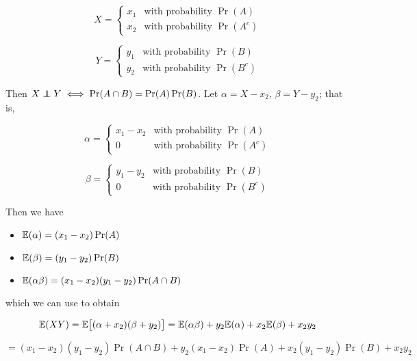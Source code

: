 \begin{enumerate}[(1)]
\begin{enumerate}[(a)]
\[
X = \begin{cases}
x_1 & \text{with probability } \Pr(A) \\
x_2 & \text{with probability } \Pr(A^c)
\end{cases} 
\]

\[
Y = \begin{cases}
y_1 & \text{with probability } \Pr(B) \\
y_2 & \text{with probability } \Pr(B^c)
\end{cases} 
\]

Then \(X \indep Y \iff \Pr(A \cap B) = \Pr(A) \Pr(B)\). Let \(\alpha = X - x_2\), \(\beta = Y - y_2\); that is,

\[
\alpha = \begin{cases}
x_1 - x_2 & \text{with probability } \Pr(A) \\
0 & \text{with probability } \Pr(A^c)
\end{cases} 
\]

\[
\beta = \begin{cases}
y_1 - y_2 & \text{with probability } \Pr(B) \\
0 & \text{with probability } \Pr(B^c)
\end{cases} 
\]

Then we have

\begin{itemize}

\item \(\mathbb{E}(\alpha) = (x_1 - x_2) \Pr(A)\)

\item \(\mathbb{E}(\beta) = (y_1 - y_2) \Pr(B)\)

\item \(\mathbb{E}(\alpha \beta) = (x_1 - x_2)(y_1 - y_2) \Pr(A \cap B)\)

\end{itemize}

which we can use to obtain

%

\[
\mathbb{E}(XY) = \mathbb{E} \big[(\alpha + x_2)(\beta + y_2) \big] = \mathbb{E}(\alpha \beta) + y_2 \mathbb{E}(\alpha) + x_2 \mathbb{E}(\beta) + x_2 y_2 
\]

\begin{equation}\label{prob.mid1.b.first}
= (x_1 - x_2)(y_1 - y_2) \Pr(A \cap B) + y_2(x_1 - x_2) \Pr(A) + x_2(y_1 - y_2) \Pr(B) + x_2 y_2
\end{equation}



\end{enumerate}
\end{enumerate}
